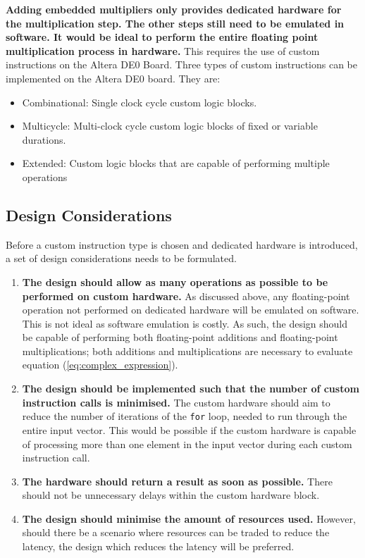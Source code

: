 \documentclass{article}
\begin{document}
\textbf{Adding embedded multipliers only provides dedicated hardware for the multiplication step. The other steps still need to be emulated in software. It would be ideal to perform the entire floating point multiplication process in hardware.} This requires the use of custom instructions on the Altera DE0 Board. Three types of custom instructions can be implemented on the Altera DE0 board. They are:
\begin{itemize}
    \item Combinational: Single clock cycle custom logic blocks.
    \item Multicycle: Multi-clock cycle custom logic blocks of fixed or variable durations.
    \item Extended: Custom logic blocks that are capable of performing multiple operations
\end{itemize}

\subsection{Design Considerations}\label{sec:design_considerations}
Before a custom instruction type is chosen and dedicated hardware is introduced, a set of design considerations needs to be formulated. 

\begin{enumerate}
    \item \textbf{The design should allow as many operations as possible to be performed on custom hardware.} As discussed above, any floating-point operation not performed on dedicated hardware will be emulated on software. This is not ideal as software emulation is costly. As such, the design should be capable of performing both floating-point additions and floating-point multiplications; both additions and multiplications are necessary to evaluate equation (\ref{eq:complex_expression}).
    \item \textbf{The design should be implemented such that the number of custom instruction calls is minimised.} The custom hardware should aim to reduce the number of iterations of the {\tt for} loop, needed to run through the entire input vector. This would be possible if the custom hardware is capable of processing more than one element in the input vector during each custom instruction call.
    \item \textbf{The hardware should return a result as soon as possible.} There should not be unnecessary delays within the custom hardware block.
    \item \textbf{The design should minimise the amount of resources used.} However, should there be a scenario where resources can be traded to reduce the latency, the design which reduces the latency will be preferred. 
\end{enumerate}
\end{document}
